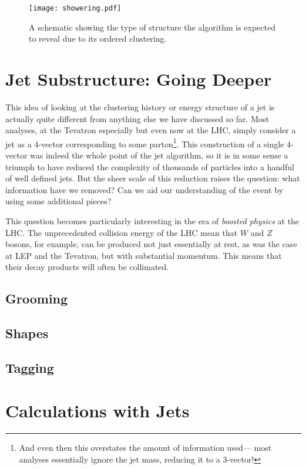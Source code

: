 
\begin{figure}
\centering
\texttt{[image: showering.pdf]}
\label{fig:jets:showering}
\caption{A schematic showing the type of structure the \kt algorithm is expected to reveal due to its \pt ordered clustering.}
\end{figure}



\section{Jet Substructure: Going Deeper}

This idea of looking at the clustering history or energy structure  of a jet is actually quite different from anything else we have discussed so far. Most analyses, at the Tevatron especially but even now at the LHC, simply consider a jet as a 4-vector corresponding to some parton\footnote{And even then this overstates the amount of information used--- most analyses essentially ignore the jet mass, reducing it to a 3-vector!}. This construction of a single 4-vector was indeed the whole point of the jet algorithm, so it is in some sense a triumph to have reduced the complexity of thousands of particles into a handful of well defined jets. But the sheer scale of this reduction raises the question: what information have we removed? Can we aid our understanding of the event by using some additional pieces?

This question becomes particularly interesting in the era of \textit{boosted physics} at the LHC. The unprecedented collision energy of the LHC mean that $W$ and $Z$ bosons, for example, can be produced not just essentially at rest, as was the case at LEP and the Tevatron, but with substantial momentum. This means that their decay products will often be collimated.



\subsection{Grooming}

\subsection{Shapes}

\subsection{Tagging}



\section{Calculations with Jets}